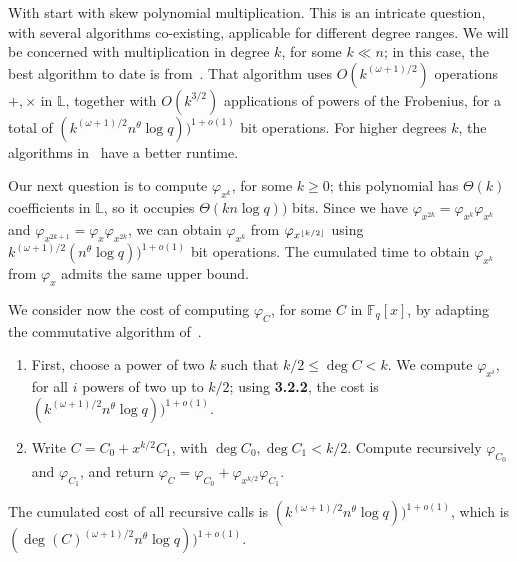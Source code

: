 \documentclass[sigconf]{acmart}
\newcommand{\F}{\mathbb{F}}
\renewcommand{\L}{\mathbb{L}}
\DeclarePairedDelimiter\floor{\lfloor}{\rfloor}
\begin{document}
\smallskip{}  With start with skew polynomial
multiplication. This is an intricate question, with several
algorithms co-existing, applicable for different degree ranges. We
will be concerned with multiplication in degree $k$,
for some $k \ll n$; in this case, the best algorithm to date is
from~\cite[Th.~7]{PUCHINGER2017b}. That algorithm uses
$O(k^{(\omega+1)/2})$ operations $+,\times$ in $\L$, together with
$O(k^{3/2})$ applications of powers of the Frobenius, for a total of
$(k^{(\omega+1)/2} n^\theta \log q))^{1+o(1)}$ bit operations.
For higher degrees $k$, the algorithms in~\cite{CaLe17} have a better
runtime.


\smallskip{} Our next question is to compute
$\varphi_{x^k}$, for some $k \ge 0$; this polynomial has
$\Theta(k)$ coefficients in $\L$, so it occupies $\Theta(k n \log q))$
bits. Since we have $\varphi_{x^{2k}}=\varphi_{x^{k}}\varphi_{x^{k}}$
and $\varphi_{x^{2k+1}} = \varphi_x\varphi_{x^{2k}}$, we can obtain
$\varphi_{x^k}$ from $\varphi_{x^{\floor*{k/2}}}$ using
$k^{(\omega+1)/2} (n^\theta \log q))^{1+o(1)}$ bit operations.
The cumulated time to obtain $\varphi_{x^k}$ from $\varphi_x$ admits
the same upper bound.

\smallskip{} We consider now the cost of computing
$\varphi_C$, for some $C$ in $\F_q[x]$, by adapting the commutative
algorithm of~\cite[Chapter~9]{Gathen:2003:MCA:945759}.
\begin{enumerate}
\item First, choose a power of two $k$ such that $k/2 \le \deg C <
  k$. We compute $\varphi_{x^i}$, for all $i$ powers of two up to
  $k/2$; using {\bf 3.2.2}, the cost is $(k^{(\omega+1)/2}
  n^\theta\log q))^{1+o(1)}$.
\item Write $C = C_0 + x^{k/2} C_1$, with $\deg C_0,\deg C_1 <
  k/2$. Compute recursively $\varphi_{C_0}$ and $\varphi_{C_1}$, and
  return $\varphi_C = \varphi_{C_0} + \varphi_{x^{k/2}}
  \varphi_{C_1}$.
\end{enumerate}
The cumulated cost of all recursive calls is
$(k^{(\omega+1)/2} n^\theta\log q))^{1+o(1)}$, which is $(\deg
(C)^{(\omega+1)/2} n^\theta\log q))^{1+o(1)}$.
\end{document}
